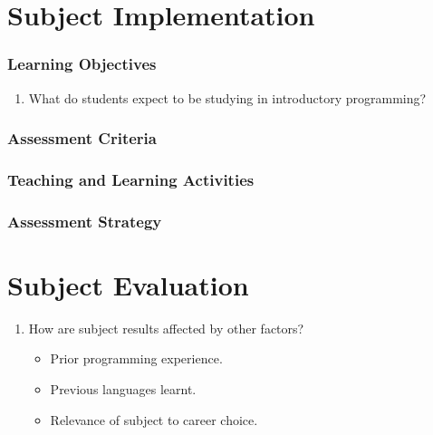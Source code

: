 
\section{Subject Implementation} %
\label{sec:subject_implementation}

\subsubsection{Learning Objectives} %
\label{ssub:learning_objectives}

\begin{enumerate}
  \item What do students expect to be studying in introductory programming?
\end{enumerate}


\subsubsection{Assessment Criteria} %
\label{ssub:assessment_criteria}


\subsubsection{Teaching and Learning Activities} %
\label{ssub:teaching_and_learning_activities}


\subsubsection{Assessment Strategy} %
\label{ssub:assessment_strategy}


\section{Subject Evaluation} %
\label{sec:subject_evaluation}

\begin{enumerate}
  \item How are subject results affected by other factors?
  \begin{itemize}
    \item Prior programming experience.
    \item Previous languages learnt.
    \item Relevance of subject to career choice.
  \end{itemize}
\end{enumerate}


